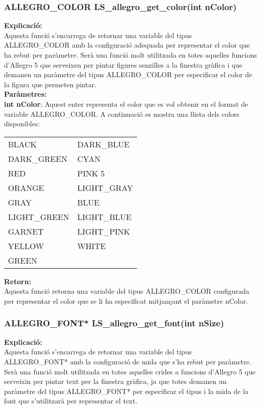 \documentclass[11pt]{article}
\begin{document}
\pagebreak
\subsubsection{ALLEGRO\_COLOR LS\_allegro\_get\_color(int nColor)}
\textbf{Explicació:}\\
Aquesta funció s'encarrega de retornar una variable del tipus ALLEGRO\_COLOR amb la configuració adequada per representar el color que ha rebut per paràmetre. Serà una funció molt utilitzada en totes aquelles funcions d'Allegro 5 que serveixen per pintar figures senzilles a la finestra gràfica i que demanen un paràmetre del tipus ALLEGRO\_COLOR per especificar el color de la figura que permeten pintar.\\

\noindent \textbf{Paràmetres:}\\
\textbf{int nColor}: Aquest enter representa el color que es vol obtenir en el format de variable ALLEGRO\_COLOR. A continuació es mostra una llista dels colors disponibles:
\begin{center}
	\begin{tabular}{l|l}
		BLACK  & DARK\_BLUE \\
		DARK\_GREEN & CYAN \\
		RED  &  PINK 5 \\
		ORANGE  & LIGHT\_GRAY \\
		GRAY & BLUE \\
		LIGHT\_GREEN  & LIGHT\_BLUE \\
		GARNET  & LIGHT\_PINK \\
		YELLOW & WHITE \\
		GREEN \\
	\end{tabular}
\end{center}

\noindent \textbf{Retorn:} \\
Aquesta funció retorna una variable del tipus ALLEGRO\_COLOR configurada per representar el color que se li ha especificat mitjançant el paràmetre nColor.
   	
\subsubsection{ALLEGRO\_FONT* LS\_allegro\_get\_font(int nSize)}
\textbf{Explicació:}\\
Aquesta funció s'encarrega de retornar una variable del tipus ALLEGRO\_FONT* amb la configuració de mida que s'ha rebut per paràmetre. Serà una funció molt utilitzada en totes aquelles crides a funcions d'Allegro 5 que serveixin per pintar text per la finestra gràfica, ja que totes demanen un paràmetre del tipus ALLEGRO\_FONT* per especificar el tipus i la mida de la font que s'utilitzarà per representar el text.\\
\end{document}
